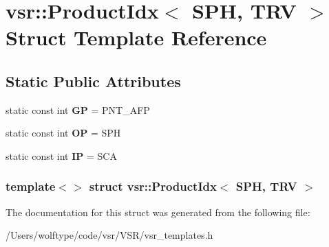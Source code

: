 \hypertarget{structvsr_1_1_product_idx_3_01_s_p_h_00_01_t_r_v_01_4}{\section{vsr\-:\-:Product\-Idx$<$ S\-P\-H, T\-R\-V $>$ Struct Template Reference}
\label{structvsr_1_1_product_idx_3_01_s_p_h_00_01_t_r_v_01_4}
}
\subsection*{Static Public Attributes}
\begin{DoxyCompactItemize}
\item 
\hypertarget{structvsr_1_1_product_idx_3_01_s_p_h_00_01_t_r_v_01_4_a48f91b7bd630c7836b61ce60e6ec3834}{static const int {\bfseries G\-P} = P\-N\-T\-\_\-\-A\-F\-P}\label{structvsr_1_1_product_idx_3_01_s_p_h_00_01_t_r_v_01_4_a48f91b7bd630c7836b61ce60e6ec3834}

\item 
\hypertarget{structvsr_1_1_product_idx_3_01_s_p_h_00_01_t_r_v_01_4_ab68f916d56e1845e91e83dc52b3f6ecd}{static const int {\bfseries O\-P} = S\-P\-H}\label{structvsr_1_1_product_idx_3_01_s_p_h_00_01_t_r_v_01_4_ab68f916d56e1845e91e83dc52b3f6ecd}

\item 
\hypertarget{structvsr_1_1_product_idx_3_01_s_p_h_00_01_t_r_v_01_4_a77bcd9d9d5fb29298635e8f566aa242c}{static const int {\bfseries I\-P} = S\-C\-A}\label{structvsr_1_1_product_idx_3_01_s_p_h_00_01_t_r_v_01_4_a77bcd9d9d5fb29298635e8f566aa242c}

\end{DoxyCompactItemize}
\subsubsection*{template$<$$>$ struct vsr\-::\-Product\-Idx$<$ S\-P\-H, T\-R\-V $>$}



The documentation for this struct was generated from the following file\-:\begin{DoxyCompactItemize}
\item 
/\-Users/wolftype/code/vsr/\-V\-S\-R/vsr\-\_\-templates.\-h\end{DoxyCompactItemize}

